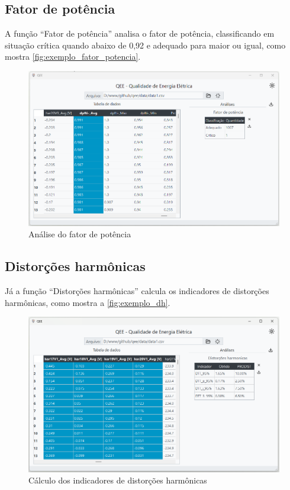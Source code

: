 \subsection{Fator de potência}

A função “Fator de potência” analisa o fator de potência, classificando em situação crítica quando abaixo de 0,92 e adequado para maior ou igual, como mostra \autoref{fig:exemplo_fator_potencia}.

\begin{figure}[H]
  \centering
  \caption{Análise do fator de potência}
  \label{fig:exemplo_fator_potencia}
  \includegraphics[width=15cm]{illustrations/figures/exemplo_fator_potencia.png}
\end{figure}

\subsection{Distorções harmônicas}

Já a função “Distorções harmônicas” calcula os indicadores de distorções harmônicas, como mostra a \autoref{fig:exemplo_dh}.


\begin{figure}[H]
  \centering
  \caption{Cálculo dos indicadores de distorções harmônicas}
  \label{fig:exemplo_dh}
  \includegraphics[width=15cm]{illustrations/figures/exemplo_dh.png}
\end{figure}

